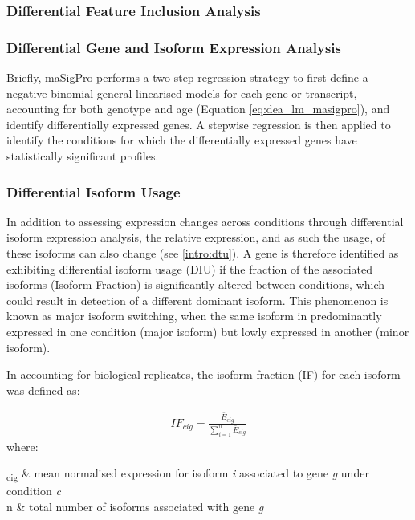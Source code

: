 \subsubsection{Differential Feature Inclusion Analysis}

\subsubsection{Differential Gene and Isoform Expression Analysis}
Briefly, maSigPro performs a two-step regression strategy to first define a negative binomial general linearised models\cite{Nueda2014} for each gene or transcript, accounting for both genotype and age (Equation \cref{eq:dea_lm_masigpro}), and identify differentially expressed genes. A stepwise regression is then applied to identify the conditions for which the differentially expressed genes have statistically significant profiles.  

\subsubsection{Differential Isoform Usage}
\label{ch:diu_method}
In addition to assessing expression changes across conditions through differential isoform expression analysis, the relative expression, and as such the usage, of these isoforms can also change (see \cref{intro:dtu}). A gene is therefore identified as exhibiting differential isoform usage (DIU) if the fraction of the associated isoforms (Isoform Fraction) is significantly altered between conditions, which could result in detection of a different dominant isoform. This phenomenon is known as major isoform switching, when the same isoform in predominantly expressed in one condition (major isoform) but lowly expressed in another (minor isoform). 

In accounting for biological replicates, the isoform fraction (IF) for each isoform was defined as:

\begin{myequation}[!h]
	\begin{align}
		IF_{cig} = \frac{\bar{E}_{cig}}{\sum_{i=1}^{n}\bar{E}_{cig}}
	\end{align}
	where:
	\begin{conditions*}
		\hspace{3mm}\textsubscript{cig} & mean normalised expression for isoform \textit{i} associated to gene \textit{g} under condition \textit{c}\\
		\hspace{3mm}n  & total number of isoforms associated with gene \textit{g}
	\end{conditions*}
	\captionsetup{width=0.95\textwidth}
	\caption[Calculation of isoform fraction for differential isoform usage analysis]%
	{\textbf{Calculation of isoform fraction for differential isoform usage analysis}. Equation is adopted from \textit{tappAS}}    
\end{myequation}

